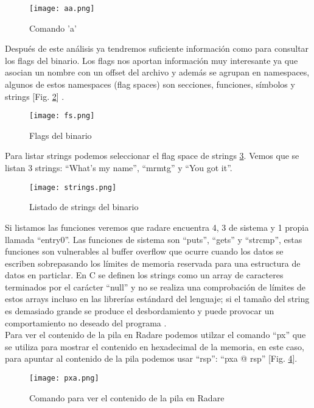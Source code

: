 \documentclass[10pt,a4paper]{article}
\begin{document}
\begin{figure}[h!]
  \centering
  \texttt{[image: aa.png]}\\
  \caption{Comando 'a'}
  \label{fig:aa}
\end{figure}

Después de este análisis ya tendremos suficiente información como para consultar los flags del binario. Los flags nos aportan información muy interesante ya que asocian un nombre con un offset del archivo y además se agrupan en namespaces, algunos de estos namespaces (flag spaces) son secciones, funciones, símbolos y strings [Fig. \ref{fig:flags}] \cite{radarebook}.

\begin{figure}[h!]
  \centering
  \texttt{[image: fs.png]}\\
  \caption{Flags del binario}
  \label{fig:flags}
\end{figure}

Para listar strings podemos seleccionar el flag space de strings \ref{fig:strings}. Vemos que se listan 3 strings: ``What's my name'', ``mrmtg'' y ``You got it''.
\begin{figure}[h!]
  \centering
  \texttt{[image: strings.png]}\\
  \caption{Listado de strings del binario}
  \label{fig:strings}
\end{figure}

Si listamos las funciones veremos que radare encuentra 4, 3 de sistema y 1 propia llamada ``entry0''. Las funciones de sistema son ``puts'', ``gets'' y ``strcmp'', estas funciones son vulnerables al buffer overflow que ocurre cuando los datos se escriben sobrepasando los límites de memoria reservada para una estructura de datos en particlar. En C se definen los strings como un array de caracteres terminados por el carácter ``null'' y no se realiza una comprobación de límites de estos arrays incluso en las librerías estándard del lenguaje; si el tamaño del string es demasiado grande se produce el desbordamiento y puede provocar un comportamiento no deseado del programa \cite{buffer_overflow}.\\

Para ver el contenido de la pila en Radare podemos utilzar el comando ``px'' que se utiliza para mostrar el contenido en hexadecimal de la memoria, en este caso, para apuntar al contenido de la pila podemos usar ``rsp'': ``pxa @ rsp'' \cite{rsp} [Fig. \ref{fig:stack}].

\begin{figure}[h!]
  \centering
  \texttt{[image: pxa.png]}\\
  \caption{Comando para ver el contenido de la pila en Radare}
  \label{fig:stack}
\end{figure}
\end{document}
